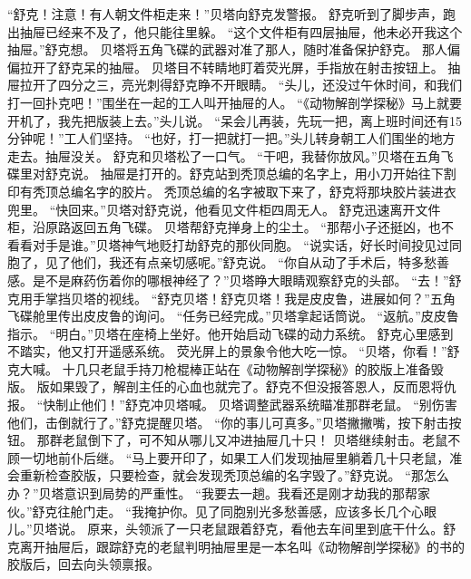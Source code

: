 \documentclass[a4paper,12pt,UTF8,twoside]{ctexbook}
\begin{document}
        “舒克！注意！有人朝文件柜走来！”贝塔向舒克发警报。 
        舒克听到了脚步声，跑出抽屉已经来不及了，他只能往里躲。 
        “这个文件柜有四层抽屉，他未必开我这个抽屉。”舒克想。 
        贝塔将五角飞碟的武器对准了那人，随时准备保护舒克。 
        那人偏偏拉开了舒克呆的抽屉。 
        贝塔目不转睛地盯着荧光屏，手指放在射击按钮上。 
        抽屉拉开了四分之三，亮光刺得舒克睁不开眼睛。 
        “头儿，还没过午休时间，和我们打一回扑克吧！”围坐在一起的工人叫开抽屉的人。 
        “《动物解剖学探秘》马上就要开机了，我先把版装上去。”头儿说。 
        “呆会儿再装，先玩一把，离上班时间还有15分钟呢！”工人们坚持。 
        “也好，打一把就打一把。”头儿转身朝工人们围坐的地方走去。抽屉没关。 
        舒克和贝塔松了一口气。 
        “干吧，我替你放风。”贝塔在五角飞碟里对舒克说。 
        抽屉是打开的。舒克站到秃顶总编的名字上，用小刀开始往下割印有秃顶总编名字的胶片。 
        秃顶总编的名字被取下来了，舒克将那块胶片装进衣兜里。 
        “快回来。”贝塔对舒克说，他看见文件柜四周无人。 
        舒克迅速离开文件柜，沿原路返回五角飞碟。 
        贝塔帮舒克掸身上的尘土。 
        “那帮小子还挺凶，也不看看对手是谁。”贝塔神气地贬打劫舒克的那伙同胞。 
        “说实话，好长时间投见过同胞了，见了他们，我还有点亲切感呢。”舒克说。 
        “你自从动了手术后，特多愁善感。是不是麻药伤着你的哪根神经了？”贝塔睁大眼睛观察舒克的头部。 
        “去！”舒克用手掌挡贝塔的视线。 
        “舒克贝塔！舒克贝塔！我是皮皮鲁，进展如何？”五角飞碟舱里传出皮皮鲁的询问。 
        “任务已经完成。”贝塔拿起话筒说。 
        “返航。”皮皮鲁指示。 
        “明白。”贝塔在座椅上坐好。他开始启动飞碟的动力系统。 
        舒克心里感到不踏实，他又打开遥感系统。 
        荧光屏上的景象令他大吃一惊。 
        “贝塔，你看！”舒克大喊。 
        十几只老鼠手持刀枪棍棒正站在《动物解剖学探秘》的胶版上准备毁版。 
        版如果毁了，解剖主任的心血也就完了。舒克不但没报答恩人，反而恩将仇报。 
        “快制止他们！”舒克冲贝塔喊。 
        贝塔调整武器系统瞄准那群老鼠。 
        “别伤害他们，击倒就行了。”舒克提醒贝塔。 
        “你的事儿可真多。”贝塔撇撇嘴，按下射击按钮。 
        那群老鼠倒下了，可不知从哪儿又冲进抽屉几十只！ 
        贝塔继续射击。老鼠不顾一切地前仆后继。 
        “马上要开印了，如果工人们发现抽屉里躺着几十只老鼠，准会重新检查胶版，只要检查，就会发现秃顶总编的名字毁了。”舒克说。 
        “那怎么办？”贝塔意识到局势的严重性。 
        “我要去一趟。我看还是刚才劫我的那帮家伙。”舒克往舱门走。 
        “我掩护你。见了同胞别光多愁善感，应该多长几个心眼儿。”贝塔说。 
        原来，头领派了一只老鼠跟着舒克，看他去车间里到底干什么。舒克离开抽屉后，跟踪舒克的老鼠判明抽屉里是一本名叫《动物解剖学探秘》的书的胶版后，回去向头领禀报。 
\end{document}
